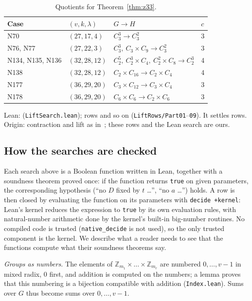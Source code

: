 \begin{table}[ht]
\centering\small
\begin{tabular}{@{}llll@{}}
\toprule
Case & $(v, k, \lambda)$ & $G \to H$ & $c$ \\ \midrule
N70 & $(27, 17, 4)$ & $C_3^3 \to C_3^2$ & 3 \\
N76, N77 & $(27, 22, 3)$ & $C_3^3,\ C_3 \times C_9 \to C_3^2$ & 3 \\
N134, N135, N136 & $(32, 28, 12)$ & $C_2^5,\ C_2^3 \times C_4,\ C_2^2 \times C_8 \to C_2^3$ & 4 \\
N138 & $(32, 28, 12)$ & $C_2 \times C_{16} \to C_2 \times C_4$ & 4 \\
N177 & $(36, 29, 20)$ & $C_3 \times C_{12} \to C_3 \times C_4$ & 3 \\
N178 & $(36, 29, 20)$ & $C_6 \times C_6 \to C_2 \times C_6$ & 3 \\
\bottomrule
\end{tabular}
\caption{Quotients for Theorem~\ref{thm:z33}.}\label{tab:lift}
\end{table}

\begin{remark}
Lean:  (\texttt{LiftSearch.lean}); rows
 and so on (\texttt{LiftRows/Part01}--\texttt{09}). It settles
 rows. Origin: contraction and lift as in~\cite[\S5]{gordon}; these rows and the
Lean search are ours.
\end{remark}

\subsection{How the searches are checked}\label{sec:searchcheck}

Each search above is a Boolean function written in Lean, together with a soundness theorem
proved once: if the function returns \texttt{true} on given parameters, the corresponding
hypothesis (``no $D$ fixed by $t$ \dots'', ``no $a$ \dots'') holds. A row is then closed by
evaluating the function on its parameters with \texttt{decide +kernel}: Lean's kernel reduces
the expression to \texttt{true} by its own evaluation rules, with natural-number arithmetic
done by the kernel's built-in big-number routines. No compiled code is trusted
(\texttt{native\_decide} is not used), so the only trusted component is the kernel. We describe
what a reader needs to see that the functions compute what their soundness theorems say.

\emph{Groups as numbers.} The elements of
$\mathbb{Z}_{m_1} \times \dots \times \mathbb{Z}_{m_r}$ are numbered $0, \dots, v-1$ in mixed
radix, $0$ first, and addition is computed on the numbers; a lemma proves that this numbering
is a bijection compatible with addition (\texttt{Index.lean}). Sums over $G$ thus become sums
over $0, \dots, v-1$.

